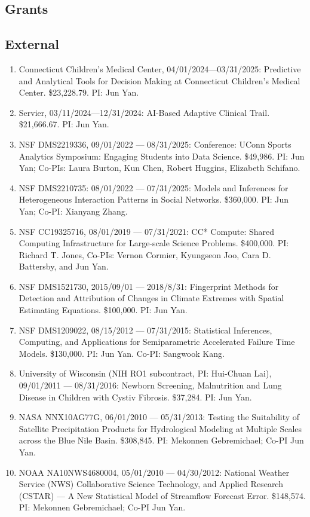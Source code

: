 \documentclass[Statistics]{vita}
\begin{document}
\begin{vita}
  \section{Grants}
    \subsection{External}
    \begin{enumerate}
    \item Connecticut Children's Medical Center, 04/01/2024---03/31/2025: Predictive and Analytical Tools for Decision Making at Connecticut Children’s Medical Center. \$23,228.79. PI: Jun Yan.
    \item Servier, 03/11/2024---12/31/2024: AI-Based Adaptive Clinical Trail. \$21,666.67.  PI: Jun Yan.
    \item NSF DMS2219336, 09/01/2022 --- 08/31/2025: Conference: UConn Sports Analytics Symposium: Engaging Students into Data Science. \$49,986. PI: Jun Yan; Co-PIs: Laura Burton, Kun Chen,  Robert Huggins, Elizabeth Schifano.
    \item NSF DMS2210735: 08/01/2022 --- 07/31/2025: Models and Inferences for Heterogeneous Interaction Patterns in Social Networks. \$360,000. PI: Jun Yan; Co-PI: Xianyang Zhang.
    \item NSF CC19325716, 08/01/2019 --- 07/31/2021: CC* Compute: Shared Computing Infrastructure for Large-scale Science Problems. \$400,000. PI:  Richard T. Jones, Co-PIs: Vernon Cormier, Kyungseon Joo, Cara D. Battersby, and Jun Yan.
    \item NSF DMS1521730, 2015/09/01 --- 2018/8/31: Fingerprint Methods for Detection and Attribution of Changes in Climate Extremes with Spatial Estimating Equations. \$100,000. PI: Jun Yan.
    \item NSF DMS1209022, 08/15/2012 --- 07/31/2015: Statistical Inferences, Computing, and Applications for Semiparametric Accelerated Failure Time Models. \$130,000. PI: Jun Yan. Co-PI: Sangwook Kang.
    \item University of Wisconsin (NIH RO1 subcontract, PI: Hui-Chuan Lai), 09/01/2011 --- 08/31/2016: Newborn Screening, Malnutrition and Lung Disease in Children with Cystiv Fibrosis. \$37,284. PI: Jun Yan.
    \item NASA NNX10AG77G, 06/01/2010 --- 05/31/2013: Testing the Suitability of Satellite Precipitation Products for Hydrological Modeling at Multiple Scales across the Blue Nile Basin. \$308,845. PI: Mekonnen Gebremichael; Co-PI Jun Yan.
    \item NOAA NA10NWS4680004, 05/01/2010 --- 04/30/2012: National Weather Service (NWS) Collaborative Science Technology, and Applied Research (CSTAR) --- A New Statistical Model of Streamflow Forecast Error. \$148,574. PI: Mekonnen Gebremichael; Co-PI Jun Yan.

\end{enumerate}
\end{vita}
\end{document}
